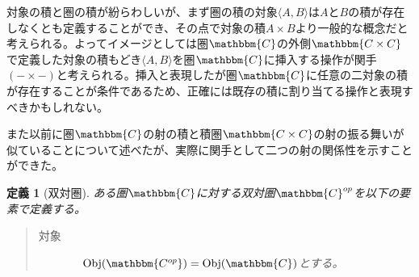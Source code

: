 \documentclass[dvipdfmx]{jsarticle}
\newcommand{\cat}[1]{\mathbbm{#1}}
\newcommand{\tuple}[1]{\langle #1\rangle}
\newcommand{\obj}[1]{\mathrm{Obj}(\cat{#1})}
\newtheorem{define}{定義}[section]
\numberwithin{proof}{subsection}
\numberwithin{prop}{subsection}
\numberwithin{define}{subsection}
\begin{document}
	対象の積と圏の積が紛らわしいが、まず圏の積の対象$\tuple{A,B}$は$A$と$B$の積が存在しなくとも定義することができ、その点で対象の積$A\times B$より一般的な概念だと考えられる。よってイメージとしては圏$\cat{C}$の外側$\cat{C\times C}$で定義した対象の積もどき$\tuple{A,B}$を圏$\cat{C}$に挿入する操作が関手$(-\times-)$と考えられる。挿入と表現したが圏$\cat{C}$に任意の二対象の積が存在することが条件であるため、正確には既存の積に割り当てる操作と表現すべきかもしれない。

	また以前に圏$\cat{C}$の射の積と積圏$\cat{C\times C}$の射の振る舞いが似ていることについて述べたが、実際に関手として二つの射の関係性を示すことができた。
	\begin{define}[双対圏]
		ある圏$\cat{C}$に対する双対圏$\cat{C}^{op}$を以下の要素で定義する。
		\begin{quote}
			\begin{description}
				\item[対象]　$\obj{C^{op}}=\obj{C}$とする。


\end{description}
\end{quote}
\end{define}
\end{document}
